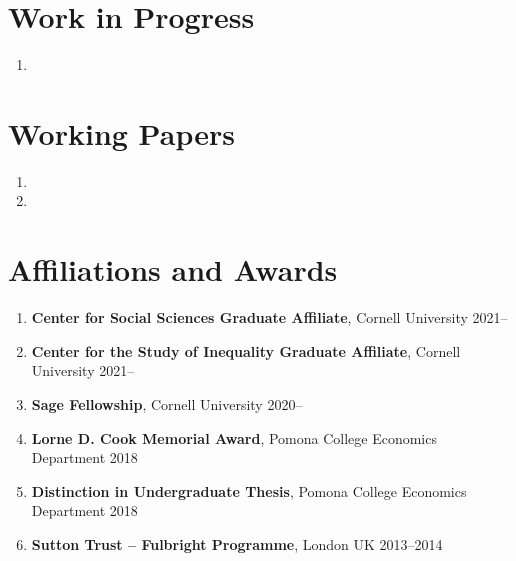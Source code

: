 \documentclass[letterpaper,11pt,oneside]{article}
\begin{document}
\section*{Work in Progress}
\begin{enumerate}[itemsep=2.5pt, label={}]
    \item {}
\end{enumerate}


\section*{Working Papers}
\begin{enumerate}[itemsep=2.5pt, label={}]
    \item {}
    \item {}
\end{enumerate}


\section*{Affiliations and Awards}
\begin{enumerate}[itemsep=2pt, label={}]
    \item \textbf{Center for Social Sciences Graduate Affiliate}, Cornell University \hfill 2021--
    \item \textbf{Center for the Study of Inequality Graduate Affiliate}, Cornell University \hfill 2021--
    \item \textbf{Sage Fellowship}, Cornell University \hfill 2020--
    \item \textbf{Lorne D. Cook Memorial Award}, Pomona College Economics Department \hfill 2018
    \item \textbf{Distinction in Undergraduate Thesis}, Pomona College Economics Department \hfill 2018
    \item \textbf{Sutton Trust -- Fulbright Programme}, London UK \hfill 2013--2014
\end{enumerate}
\end{document}

